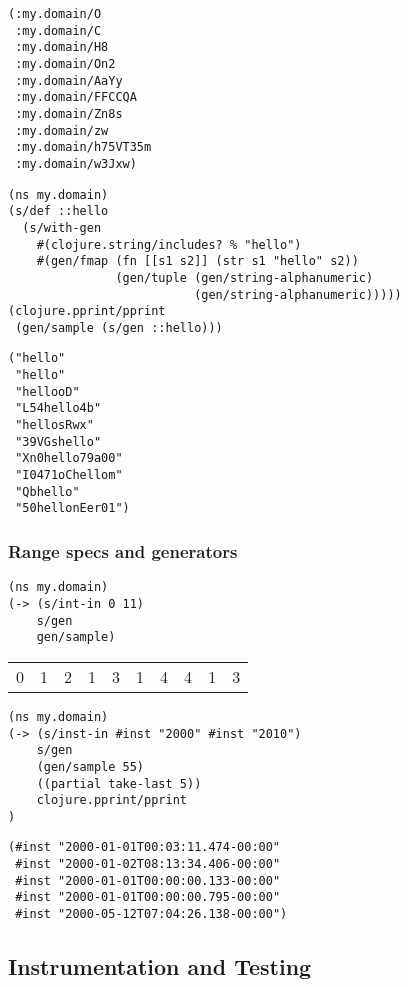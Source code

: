 \documentclass[10pt,oneside,x11names]{article}
\begin{document}
\begin{verbatim}
(:my.domain/O
 :my.domain/C
 :my.domain/H8
 :my.domain/On2
 :my.domain/AaYy
 :my.domain/FFCCQA
 :my.domain/Zn8s
 :my.domain/zw
 :my.domain/h75VT35m
 :my.domain/w3Jxw)
\end{verbatim}

\begin{verbatim}
(ns my.domain)
(s/def ::hello
  (s/with-gen
    #(clojure.string/includes? % "hello")
    #(gen/fmap (fn [[s1 s2]] (str s1 "hello" s2))
               (gen/tuple (gen/string-alphanumeric)
                          (gen/string-alphanumeric)))))
(clojure.pprint/pprint
 (gen/sample (s/gen ::hello)))
\end{verbatim}

\begin{verbatim}
("hello"
 "hello"
 "hellooD"
 "L54hello4b"
 "hellosRwx"
 "39VGshello"
 "Xn0hello79a00"
 "I0471oChellom"
 "Qbhello"
 "50hellonEer01")
\end{verbatim}

\subsubsection{Range specs and generators}
\label{sec:org38927b2}

\begin{verbatim}
(ns my.domain)
(-> (s/int-in 0 11)
    s/gen
    gen/sample)
\end{verbatim}

\begin{center}
\begin{tabular}{rrrrrrrrrr}
0 & 1 & 2 & 1 & 3 & 1 & 4 & 4 & 1 & 3\\
\end{tabular}
\end{center}

\begin{verbatim}
(ns my.domain)
(-> (s/inst-in #inst "2000" #inst "2010")
    s/gen
    (gen/sample 55)
    ((partial take-last 5))
    clojure.pprint/pprint
)

\end{verbatim}

\begin{verbatim}
(#inst "2000-01-01T00:03:11.474-00:00"
 #inst "2000-01-02T08:13:34.406-00:00"
 #inst "2000-01-01T00:00:00.133-00:00"
 #inst "2000-01-01T00:00:00.795-00:00"
 #inst "2000-05-12T07:04:26.138-00:00")
\end{verbatim}

\subsection{Instrumentation and Testing}
\label{sec:org4625e32}
\end{document}
